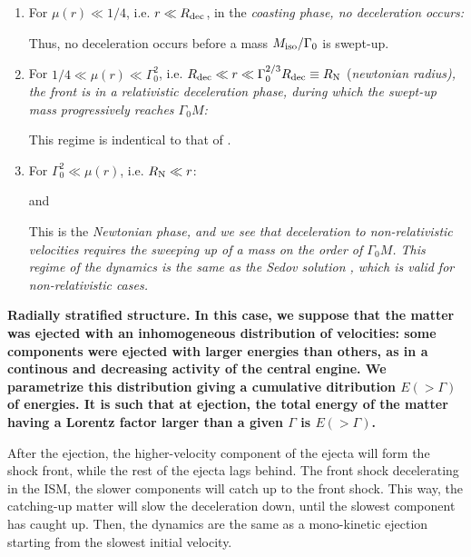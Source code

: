 \begin{enumerate}
	\item For $\mu(r) \ll 1/4$, i.e. $r \ll R_{\rm{dec}}$, in the \it{coasting phase}, no deceleration occurs:


    Thus, no deceleration occurs before a mass $M_{\rm{iso}}/\Gamma_0$ is swept-up.

	\item For $1/4 \ll \mu(r) \ll \Gamma_0 ^ 2$, i.e. $R_{\rm{dec}} \ll r \ll \Gamma_0^{2/3} R_{\rm{dec}} \equiv R_{\rm{N}}$ (\it{newtonian radius}), the front is in a \it{relativistic deceleration phase}, during which the swept-up mass progressively reaches $\Gamma_0 M$:


    This regime is indentical to that of \cite{59}.

	\item For $\Gamma_0^2 \ll \mu(r)$, i.e. $ R_{\rm{N}} \ll r$:


	and


	This is the \it{Newtonian phase}, and we see that deceleration to non-relativistic velocities requires the sweeping up of a mass on the order of $\Gamma_0 M$. This regime of the dynamics is the same as the Sedov solution \cite{60}, which is valid for non-relativistic cases.
\end{enumerate}

\bf{Radially stratified structure.} In this case, we suppose that the matter was ejected with an inhomogeneous distribution of velocities: some components were ejected with larger energies than others, as in a continous and decreasing activity of the central engine. We parametrize this distribution giving a cumulative ditribution $E( > \Gamma)$ of energies. It is such that at ejection, the total energy of the matter having a Lorentz factor larger than a given $\Gamma$ is $E( > \Gamma)$.

After the ejection, the higher-velocity component of the ejecta will form the shock front, while the rest of the ejecta lags behind. The front shock decelerating in the ISM, the slower components will catch up to the front shock. This way, the catching-up matter will slow the deceleration down, until the slowest component has caught up. Then, the dynamics are the same as a mono-kinetic ejection starting from the slowest initial velocity.

